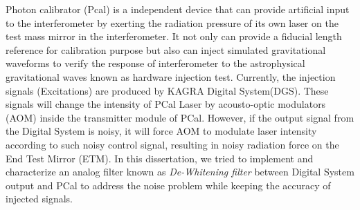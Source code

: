 Photon calibrator (Pcal) is a independent device that can provide artificial input to the interferometer by exerting the radiation pressure of its own laser on the test mass mirror in the interferometer. It not only can provide a fiducial length reference for calibration purpose but also can inject simulated gravitational waveforms to verify the response of interferometer to the astrophysical gravitational waves known as hardware injection test. 
Currently, the injection signals (Excitations) are produced by KAGRA Digital System(DGS). These signals will change the intensity of PCal Laser by acousto-optic modulators (AOM) inside the transmitter module of PCal. However, if the output signal from the Digital System is noisy, it will force AOM to modulate laser intensity according to such noisy control signal, resulting in noisy radiation force on the End Test Mirror (ETM). In this dissertation, we tried to implement and characterize an analog filter known as \emph{De-Whitening filter} between Digital System output and PCal to address the noise problem while keeping the accuracy of injected signals.

%
%
%
%
%
